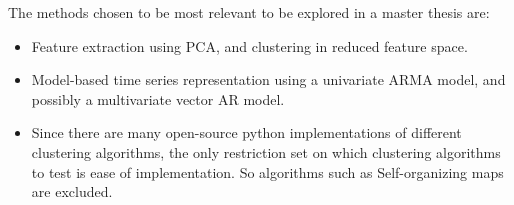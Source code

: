 \documentclass[18pt, a3paper, portrait]{tikzposter}
\begin{document}
{
    The methods chosen to be most relevant to be explored in a master thesis are:
    \begin{itemize}
        \item Feature extraction using PCA, and clustering in reduced feature space.
        \item Model-based time series representation using a univariate ARMA model, and possibly a multivariate vector AR model.
        \item Since there are many open-source python implementations of different clustering algorithms, the only restriction set on which clustering algorithms to test is ease of implementation. So algorithms such as Self-organizing maps are excluded.
    \end{itemize}
}
\end{document}
